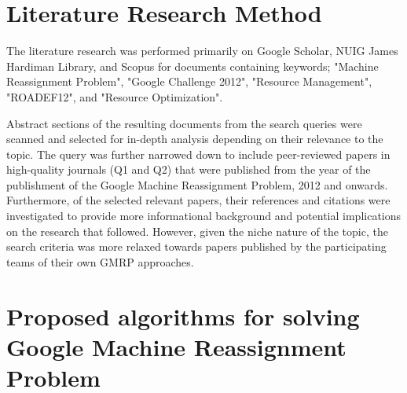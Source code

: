 \documentclass[a4paper,12pt]{Classes/RoboticsLaTeX}
\begin{document}
\section{Literature Research Method}

The literature research was performed primarily on Google Scholar, NUIG James Hardiman Library, and Scopus for documents containing keywords; "Machine Reassignment Problem", "Google Challenge 2012", "Resource Management", "ROADEF12", and "Resource Optimization".

Abstract sections of the resulting documents from the search queries were scanned and selected for in-depth analysis depending on their relevance to the topic. The query was further narrowed down to include peer-reviewed papers in high-quality journals (Q1 and Q2) that were published from the year of the publishment of the Google Machine Reassignment Problem, 2012 and onwards. Furthermore, of the selected relevant papers, their references and citations were investigated to provide more informational background and potential implications on the research that followed.
However, given the niche nature of the topic, the search criteria was more relaxed towards papers published by the participating teams of their own GMRP approaches.

\section{Proposed algorithms for solving Google Machine Reassignment Problem}
\end{document}
